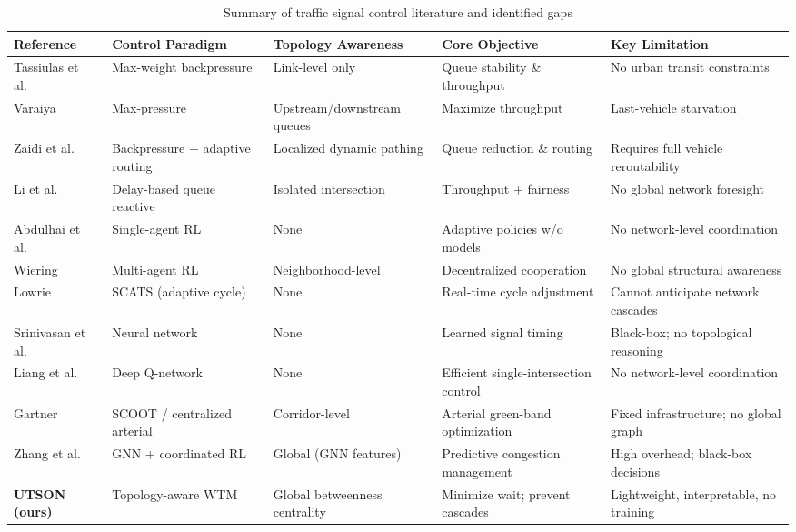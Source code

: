 \documentclass[letterpaper, conference]{IEEEtran}
\begin{document}
\begin{table}[t]
\centering
\caption{Summary of traffic signal control literature and identified gaps}
\label{tab:lit_review}
\renewcommand{\arraystretch}{1.3}
\begin{tabularx}{\textwidth}{|>{\raggedright\arraybackslash}p{2.6cm}|>{\raggedright\arraybackslash}X|>{\raggedright\arraybackslash}X|>{\raggedright\arraybackslash}X|>{\raggedright\arraybackslash}X|}
\hline
\textbf{Reference} & \textbf{Control Paradigm} & \textbf{Topology Awareness} & \textbf{Core Objective} & \textbf{Key Limitation} \\
\hline
Tassiulas et al.~\cite{tassiulas1992stability} & Max-weight backpressure & Link-level only & Queue stability \& throughput & No urban transit constraints \\
\hline
Varaiya~\cite{varaiya2013maxpressure} & Max-pressure & Upstream/downstream queues & Maximize throughput & Last-vehicle starvation \\
\hline
Zaidi et al.~\cite{zaidi2016backpressure} & Backpressure + adaptive routing & Localized dynamic pathing & Queue reduction \& routing & Requires full vehicle reroutability \\
\hline
Li et al.~\cite{li2018delay} & Delay-based queue reactive & Isolated intersection & Throughput + fairness & No global network foresight \\
\hline
Abdulhai et al.~\cite{abdulhai2003reinforcement} & Single-agent RL & None & Adaptive policies w/o models & No network-level coordination \\
\hline
Wiering~\cite{wiering2000multi} & Multi-agent RL & Neighborhood-level & Decentralized cooperation & No global structural awareness \\
\hline
Lowrie~\cite{lowrie1982scats} & SCATS (adaptive cycle) & None & Real-time cycle adjustment & Cannot anticipate network cascades \\
\hline
Srinivasan et al.~\cite{srinivasan2008network} & Neural network & None & Learned signal timing & Black-box; no topological reasoning \\
\hline
Liang et al.~\cite{liang2020contextual} & Deep Q-network & None & Efficient single-intersection control & No network-level coordination \\
\hline
Gartner~\cite{gartner2005state} & SCOOT / centralized arterial & Corridor-level & Arterial green-band optimization & Fixed infrastructure; no global graph \\
\hline
Zhang et al.~\cite{zhang2021trafficgcn} & GNN + coordinated RL & Global (GNN features) & Predictive congestion management & High overhead; black-box decisions \\
\hline
\textbf{UTSON (ours)} & Topology-aware WTM & Global betweenness centrality & Minimize wait; prevent cascades & Lightweight, interpretable, no training \\
\hline
\end{tabularx}
\end{table}
\end{document}
